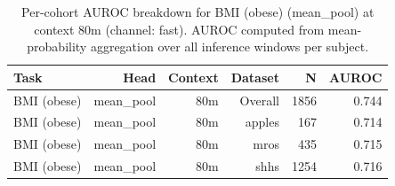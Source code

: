 \begin{table}[ht]
\centering
\caption{Per-cohort AUROC breakdown for BMI (obese) (mean_pool) at context 80m (channel: fast). AUROC computed from mean-probability aggregation over all inference windows per subject.}
\label{tab:cohort_bmi_binary_mean_pool_fast}
\begin{tabular}{lrrrrr}
\toprule
Task & Head & Context & Dataset & N & AUROC \\
\midrule
BMI (obese) & mean_pool & 80m & Overall & 1856 & 0.744 \\
BMI (obese) & mean_pool & 80m & apples & 167 & 0.714 \\
BMI (obese) & mean_pool & 80m & mros & 435 & 0.715 \\
BMI (obese) & mean_pool & 80m & shhs & 1254 & 0.716 \\
\bottomrule
\end{tabular}
\end{table}